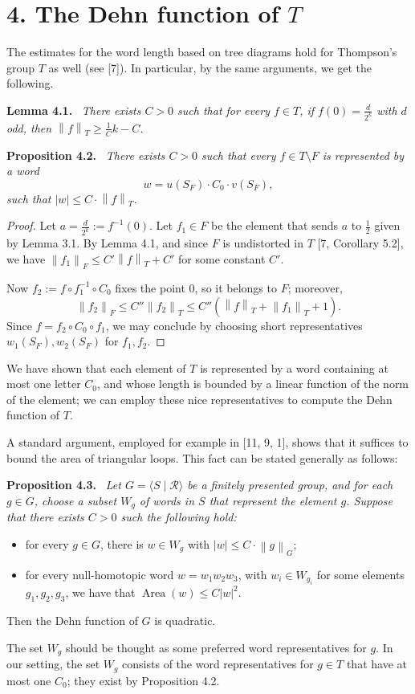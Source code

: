 \documentclass[10pt,a4paper]{article}
\newcommand{\norm}[1]{\left\lVert#1\right\rVert}
\newcommand{\sourcepagenumber}{editorial cover}
\newcommand{\SourcePage}[1]{\clearpage\gdef\sourcepagenumber{#1}}
\newenvironment{authorstatement}[1]{\par\medskip\noindent\textbf{#1}\ \itshape}{\par\medskip}
\begin{document}
\section*{4. The Dehn function of $T$}
The estimates for the word length based on tree diagrams hold for Thompson's group $T$ as well (see [7]). In particular, by the same arguments, we get the following.

\SourcePage{7}
\begin{authorstatement}{Lemma 4.1.}
There exists $C>0$ such that for every $f\in T$, if $f(0)=\frac d{2^k}$ with $d$ odd, then $\norm{f}_T\ge\frac1Ck-C$.
\end{authorstatement}
\begin{authorstatement}{Proposition 4.2.}
There exists $C>0$ such that every $f\in T\setminus F$ is represented by a word
\[
w=u(S_F)\cdot C_0\cdot v(S_F),
\]
such that $|w|\le C\cdot\norm{f}_T$.
\end{authorstatement}
\begin{proof}
Let $a=\frac d{2^k}:=f^{-1}(0)$. Let $f_1\in F$ be the element that sends $a$ to $\frac12$ given by Lemma 3.1. By Lemma 4.1, and since $F$ is undistorted in $T$ [7, Corollary 5.2], we have $\norm{f_1}_F\le C'\norm{f}_T+C'$ for some constant $C'$.

Now $f_2:=f\circ f_1^{-1}\circ C_0$ fixes the point $0$, so it belongs to $F$; moreover,
\[
\norm{f_2}_F\le C''\norm{f_2}_T\le C''(\norm{f}_T+\norm{f_1}_T+1).
\]
Since $f=f_2\circ C_0\circ f_1$, we may conclude by choosing short representatives $w_1(S_F),w_2(S_F)$ for $f_1,f_2$.
\end{proof}
We have shown that each element of $T$ is represented by a word containing at most one letter $C_0$, and whose length is bounded by a linear function of the norm of the element; we can employ these nice representatives to compute the Dehn function of $T$.

A standard argument, employed for example in [11, 9, 1], shows that it suffices to bound the area of triangular loops. This fact can be stated generally as follows:
\begin{authorstatement}{Proposition 4.3.}
Let $G=\langle S\mid\mathcal{R}\rangle$ be a finitely presented group, and for each $g\in G$, choose a subset $W_g$ of words in $S$ that represent the element $g$. Suppose that there exists $C>0$ such the following hold:
\begin{itemize}
\item[$\circ$] for every $g\in G$, there is $w\in W_g$ with $|w|\le C\cdot\norm{g}_G$;
\item[$\circ$] for every null-homotopic word $w=w_1w_2w_3$, with $w_i\in W_{g_i}$ for some elements $g_1,g_2,g_3$, we have that $\operatorname{Area}(w)\le C|w|^2$.
\end{itemize}
Then the Dehn function of $G$ is quadratic.
\end{authorstatement}
The set $W_g$ should be thought as some preferred word representatives for $g$. In our setting, the set $W_g$ consists of the word representatives for $g\in T$ that have at most one $C_0$; they exist by Proposition 4.2.
\end{document}
